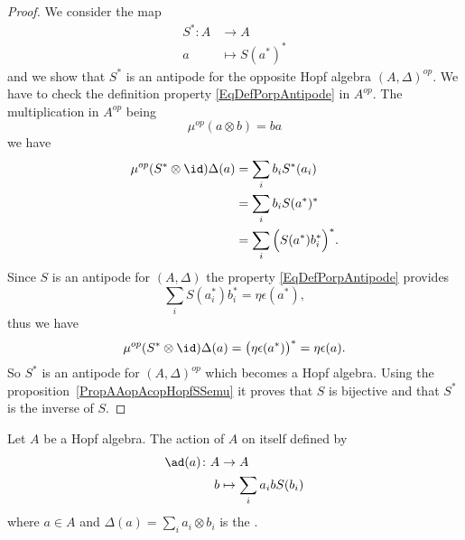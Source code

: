 \begin{proof}
	We consider the map
	\begin{equation}
		\begin{aligned}
			S^*\colon A & \to A            \\
			a           & \mapsto S(a^*)^*
		\end{aligned}
	\end{equation}
	and we show that \( S^*\) is an antipode for the opposite Hopf algebra \( (A,\Delta)^{op}\). We have to check the definition property \eqref{EqDefPorpAntipode} in \( A^{op}\). The multiplication in \( A^{op}\) being
	\begin{equation}
		\mu^{op}(a\otimes b)=ba
	\end{equation}
	we have
	\begin{equation}
		\begin{aligned}[]
			\mu^{op}(S^*\otimes \id)\Delta(a) & =\sum_ib_iS^*(a_i)                \\
			                                  & =\sum_ib_iS(a^*)^*                \\
			                                  & =\sum_i\Big( S(a^*)b_i^* \Big)^*.
		\end{aligned}
	\end{equation}
	Since \( S\) is an antipode for \( (A,\Delta)\) the property \eqref{EqDefPorpAntipode} provides
	\begin{equation}
		\sum_iS(a_i^*)b_i^*=\eta\epsilon(a^*),
	\end{equation}
	thus we have
	\begin{equation}
		\mu^{op}(S^*\otimes \id)\Delta(a)=\big( \eta\epsilon(a^*) \big)^*=\eta\epsilon(a).
	\end{equation}
	So \( S^*\) is an antipode for \( (A,\Delta)^{op}\) which becomes a Hopf algebra. Using the proposition~\ref{PropAAopAcopHopfSSemu} it proves that \( S\) is bijective and that \( S^*\) is the inverse of \( S\).
\end{proof}

\begin{definition}
	Let \( A\) be a Hopf algebra. The action of \( A\) on itself defined by
	\begin{equation}
		\begin{aligned}
			\ad(a)\colon A & \to A                      \\
			b              & \mapsto \sum_i a_i bS(b_i)
		\end{aligned}
	\end{equation}
	where \( a\in A\) and \( \Delta(a)=\sum_i a_i\otimes b_i\) is the .
\end{definition}

